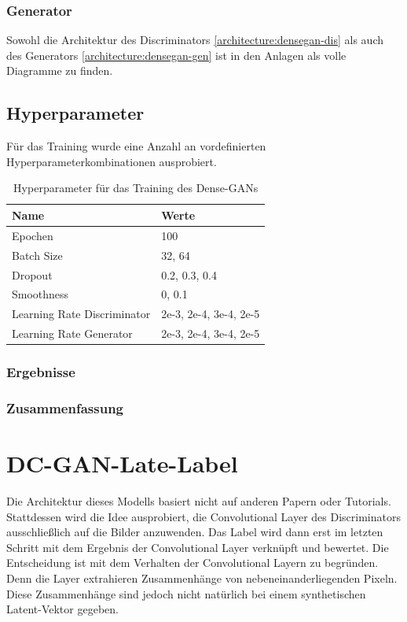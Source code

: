 \subsubsection{Generator}

Sowohl die Architektur des Discriminators \cref{architecture:densegan-dis} als auch des Generators \cref{architecture:densegan-gen} ist in den Anlagen als volle Diagramme zu finden.

\subsection{Hyperparameter}
Für das Training wurde eine Anzahl an vordefinierten Hyperparameterkombinationen ausprobiert.

\begin{table}[H]
	\centering
	\begin{tabular}{l l}
		Name                        & Werte            \\ \hline
		Epochen                     & 100              \\
		Batch Size                  & 32, 64           \\
		Dropout                     & 0.2, 0.3, 0.4         \\
		Smoothness                  & 0, 0.1           \\
		Learning Rate Discriminator & 2e-3, 2e-4, 3e-4, 2e-5 \\
		Learning Rate Generator     & 2e-3, 2e-4, 3e-4, 2e-5
	\end{tabular}
	\caption{Hyperparameter für das Training des Dense-GANs}
\end{table}

\subsubsection{Ergebnisse}
\subsubsection{Zusammenfassung}


\section{DC-GAN-Late-Label}
\label{section:dc-gan-late-label}
Die Architektur dieses Modells basiert nicht auf anderen Papern oder Tutorials.
Stattdessen wird die Idee ausprobiert, die Convolutional Layer des Discriminators ausschließlich auf die Bilder anzuwenden.
Das Label wird dann erst im letzten Schritt mit dem Ergebnis der Convolutional Layer verknüpft und bewertet.
Die Entscheidung ist mit dem Verhalten der Convolutional Layern zu begründen.
Denn die Layer extrahieren Zusammenhänge von nebeneinanderliegenden Pixeln.
Diese Zusammenhänge sind jedoch nicht natürlich bei einem synthetischen Latent-Vektor gegeben.

